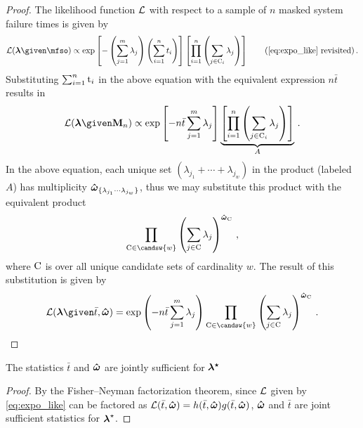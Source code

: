 \documentclass[../main.tex]{subfiles}
\begin{document}
\begin{proof}
The likelihood function $\mathcal{L}$ with respect to a sample of $n$ masked system failure times is given by
\begin{equation*}
\likelihood(\vec\lambda \given \mfso) \propto
    \exp \left [ - \left ( \sum_{j=1}^{m} \lambda_j \right ) \left ( \sum_{i=1}^{n} t_i \right ) \right ]
    \left [ \prod_{i=1}^{n} \left ( \sum_{j \in \cand_i} \lambda_j \right ) \right ]\tag{\ref{eq:expo_like} revisited}\,.
\end{equation*}
Substituting $\sum_{i=1}^{n} \mathrm{t}_i$ in the above equation with the equivalent expression $n \bar{t}$ results in
\begin{equation}
\likelihood(\vec\lambda \given \mfs) \propto
    \exp \left [ - n \bar{t} \sum_{j=1}^{m} \lambda_j \right ]
    \underbrace{
        \left [ \prod_{i=1}^{n} \left ( \sum_{j \in \cand_i} \lambda_j \right ) \right ]
    }_{A}\,.
\end{equation}
In the above equation, each unique set $\left(\lambda_{j_1} + \cdots + \lambda_{j_w}\right)$ in the product (labeled $A$) has multiplicity $\boldsymbol{\hat\omega}_{\{\lambda_{j_1} \cdots \lambda_{j_w}\}}$, thus we may substitute this product with the equivalent product
\begin{equation}
    \prod_{\cand \in \candsw{w}} \left ( \sum_{j \in \cand} \lambda_j \right )^{\cntsymb_{\cand}}\,,
\end{equation}
where $\mathrm{C}$ is over all unique candidate sets of cardinality $w$. The result of this substitution is given by
\begin{equation}
\likelihood(\vec\lambda \given \bar{t}, \cntsymb) =
    \exp \left ( -n \bar{t} \sum_{j=1}^{m} \lambda_j \right )
    \prod_{\cand \in \candsw{w}} \left ( \sum_{j \in \cand} \lambda_j \right )^{\cntsymb_{\cand}}\,.
\end{equation}
\end{proof}

The statistics $\bar{t}$ and $\boldsymbol{\hat\omega}$ are jointly sufficient for $\boldsymbol{{\lambda}^{\star}}$
\begin{proof}
By the Fisher–Neyman factorization theorem, since $\mathcal{L}$ given by \cref{eq:expo_like} can be factored as $\mathcal{L}(\bar{t}, \boldsymbol{\hat\omega}) = h(\bar{t}, \boldsymbol{\hat\omega}) g(\bar{t}, \boldsymbol{\hat\omega})$, $\boldsymbol{\hat\omega}$ and $\bar t$ are joint sufficient statistics for ${\boldsymbol{\lambda}}^{\star}$.
\end{proof}
\end{document}

